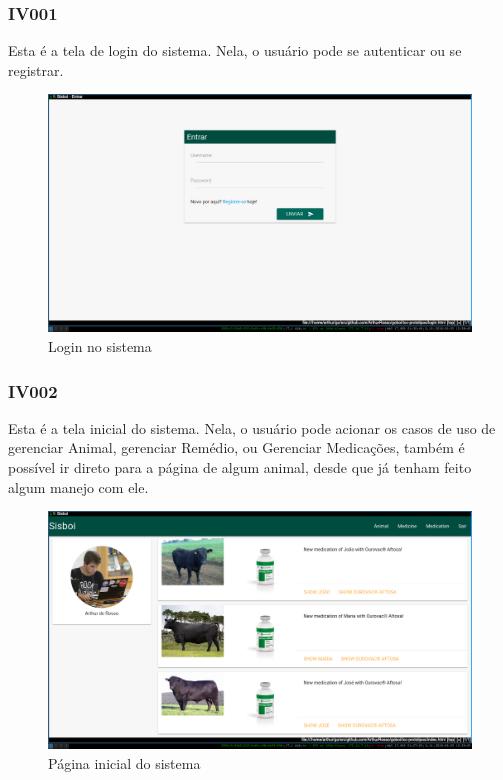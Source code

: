 \documentclass[12pt]{article}
\begin{document}
\subsubsection{IV001}

Esta é a tela de login do sistema. Nela, o usuário pode se autenticar ou se registrar.
\begin{figure}[!h]
	\begin{center}
		\caption{Login no sistema}
		\includegraphics[width=13cm]{img/prototipos/login.png}


	\end{center}
\end{figure}

\subsubsection{IV002}

Esta é a tela inicial do sistema. Nela, o usuário pode acionar os casos de uso de gerenciar Animal, gerenciar Remédio, ou Gerenciar Medicações, também é possível ir direto para a página de algum animal, desde que já tenham feito algum manejo com ele.
\begin{figure}[!h]
	\begin{center}
		\caption{Página inicial do sistema}
		\includegraphics[width=13cm]{img/prototipos/index.png}


	\end{center}
\end{figure}
\end{document}
